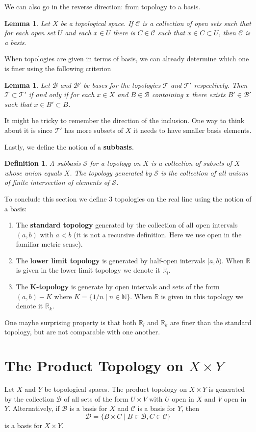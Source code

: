 \documentclass{article}
\newcommand{\Ba}{\mathcal{B}}
\newcommand{\Ta}{\mathcal{T}}
\newcommand{\R}{\mathbb{R}}
\newcommand{\N}{\mathbb{N}}
\newcommand{\Ss}{\mathcal{S}} %
\newtheorem{lemma}[theorem]{Lemma}
\newtheorem*{definition}{Definition}
\theoremstyle{remark}
\begin{document}
We can also go in the reverse direction: from topology to a basis.
\begin{lemma}
    Let $X$ be a topological space. If $\mathcal{C}$ is a collection of open sets such that for each open set $U$ and each $x\in U$ there is $C\in\mathcal{C}$ such that $x\in C\subset U$, then $\mathcal{C}$ is a basis.
\end{lemma}

When topologies are given in terms of basis, we can already determine which one is finer using the following criterion
\begin{lemma}
    Let $\Ba$ and $\Ba'$ be bases for the topologies $\Ta$ and $\Ta'$ respectively. Then
    $\Ta\subset\Ta'$ if and only if for each $x\in X$ and $B\in\Ba$ containing $x$ there exists $B'\in\Ba'$ such that $x\in B'\subset B$.
\end{lemma}
It might be tricky to remember the direction of the inclusion. One way to think about it is since $\Ta'$ has more subsets of $X$ it needs to have smaller basis elements.

Lastly, we define the notion of a \textbf{subbasis}.
\begin{definition}
    A subbasis $\Ss$ for a topology on $X$ is a collection of subsets of $X$ whose union equals $X$. The topology generated by $\Ss$ is the collection of all unions of finite intersection of elements of $\Ss$.
\end{definition}

To conclude this section we define 3 topologies on the real line using the notion of a basis:
\begin{enumerate}
    \item The \textbf{standard topology} generated by the collection of all open intervals $(a,b)$ with $a<b$ (it is not a recursive definition. Here we use open in the familiar metric sense).
    \item The \textbf{lower limit topology} is generated by half-open intervals $[a,b)$. When $\R$ is given in the lower limit topology we denote it $\R_l$.
    \item The \textbf{K-topology} is generate by open intervals and sets of the form $(a,b)-K$ where $K=\{1/n\mid n\in\N\}$. When $\R$ is given in this topology we denote it $\R_k$.
\end{enumerate}
One maybe surprising property is that both $\R_l$ and $\R_k$ are finer than the standard topology, but are not comparable with one another.

\section{The Product Topology on $X\times Y$}\label{sec:XtimesY}
Let $X$ and $Y$ be topological spaces. 
The product topology on $X\times Y$ is generated by the collection $\Ba$ of all sets of the form $U\times V$ with $U$ open in $X$ and $V$ open in $Y$.
Alternatively, if $\Ba$ is a basis for $X$ and $\mathcal{C}$ is a basis for $Y$, then
$$
    \mathcal{D}=\{B\times C\mid B\in\Ba, C\in\mathcal{C}\}
$$
is a basis for $X\times Y$.
\end{document}
